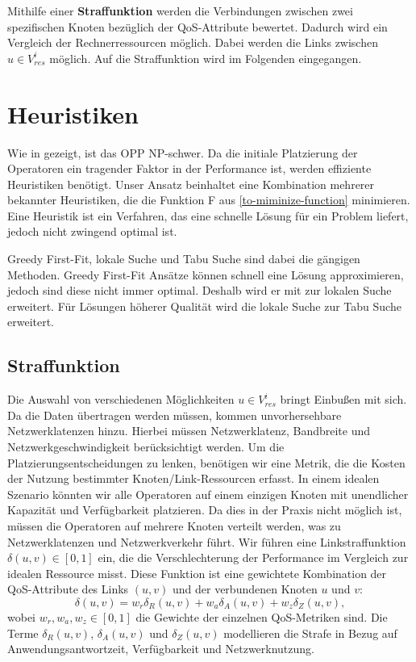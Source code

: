 \documentclass{article}
\begin{document}


Mithilfe einer \textbf{Straffunktion} werden die Verbindungen zwischen zwei spezifischen Knoten bezüglich der QoS-Attribute bewertet. Dadurch wird ein Vergleich 
der Rechnerressourcen möglich. Dabei werden die Links zwischen $u \in V_{res}^i$ möglich. Auf die Straffunktion wird im Folgenden eingegangen. 




\section{Heuristiken} \label{Heurisiken}
Wie in \cite{cardellini-optimal_operatorplc} gezeigt, ist das 
OPP NP-schwer.
Da die initiale Platzierung der Operatoren ein tragender Faktor in der Performance ist, werden effiziente Heuristiken benötigt.
Unser Ansatz beinhaltet eine Kombination mehrerer bekannter Heuristiken, die die Funktion F aus \ref{to-miminize-function} minimieren. 
Eine Heuristik ist ein Verfahren, das eine schnelle Lösung für ein Problem liefert, jedoch nicht zwingend optimal ist. 

Greedy First-Fit, lokale Suche und Tabu Suche sind dabei die gängigen Methoden. 
Greedy First-Fit Ansätze können schnell eine Lösung approximieren, jedoch sind diese nicht immer optimal. Deshalb wird er mit zur lokalen Suche erweitert.
Für Lösungen höherer Qualität wird die lokale Suche zur Tabu Suche erweitert.


\subsection{Straffunktion}
Die Auswahl von verschiedenen Möglichkeiten \(u \in V_{res}^i\) bringt Einbußen mit sich. Da die Daten übertragen werden müssen, kommen unvorhersehbare Netzwerklatenzen hinzu. 
Hierbei müssen Netzwerklatenz, Bandbreite und Netzwerkgeschwindigkeit \cite{efficient-operator-placement} berücksichtigt werden.
Um die Platzierungsentscheidungen zu lenken, benötigen wir eine Metrik, die die Kosten der Nutzung bestimmter Knoten/Link-Ressourcen erfasst. 
In einem idealen Szenario könnten wir alle Operatoren auf einem einzigen Knoten mit unendlicher Kapazität und Verfügbarkeit platzieren. 
Da dies in der Praxis nicht möglich ist, müssen die Operatoren auf mehrere Knoten verteilt werden, was zu Netzwerklatenzen und Netzwerkverkehr führt.
Wir führen eine Linkstraffunktion \(\delta(u, v) \in [0, 1]\) ein, die die Verschlechterung der Performance im Vergleich zur idealen Ressource misst. 
Diese Funktion ist eine gewichtete Kombination der QoS-Attribute des Links \((u, v)\) und der verbundenen Knoten \(u\) und \(v\):
\[
\delta(u, v) = w_r \delta_R(u, v) + w_a \delta_A(u, v) + w_z \delta_Z(u, v),
\]
wobei \(w_r, w_a, w_z \in [0, 1]\) die Gewichte der einzelnen QoS-Metriken sind. 
Die Terme \(\delta_R(u, v)\), \(\delta_A(u, v)\) und \(\delta_Z(u, v)\) modellieren die Strafe in Bezug auf Anwendungsantwortzeit, Verfügbarkeit und Netzwerknutzung.
\end{document}
